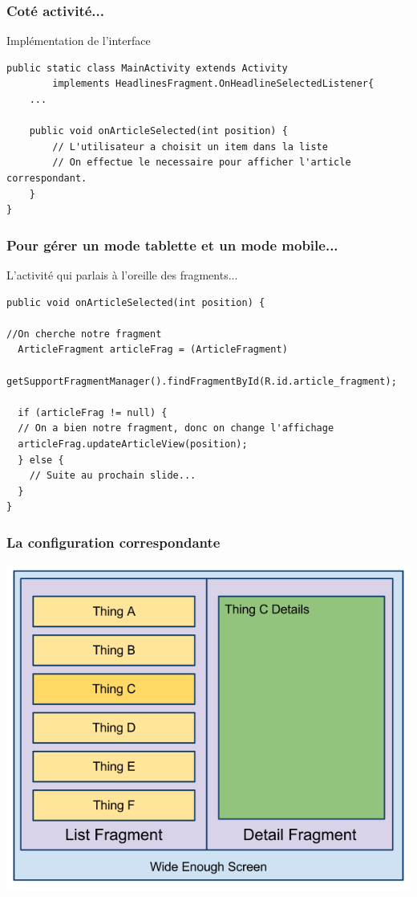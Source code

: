 \documentclass{beamer}
\begin{document}
\begin{frame}[fragile]
\frametitle{Coté activité...}
\begin{block}{Implémentation de l'interface}
\begin{lstlisting}
public static class MainActivity extends Activity
        implements HeadlinesFragment.OnHeadlineSelectedListener{
    ...
    
    public void onArticleSelected(int position) {
        // L'utilisateur a choisit un item dans la liste
        // On effectue le necessaire pour afficher l'article correspondant.
    }
}
\end{lstlisting}

\end{block}
\end{frame}

\begin{frame}[fragile]
\frametitle{Pour gérer un mode tablette et un mode mobile...}
\begin{block}{L'activité qui parlais à l'oreille des fragments...}
\begin{lstlisting}
public void onArticleSelected(int position) {

//On cherche notre fragment
  ArticleFragment articleFrag = (ArticleFragment)
    getSupportFragmentManager().findFragmentById(R.id.article_fragment);

  if (articleFrag != null) {
  // On a bien notre fragment, donc on change l'affichage
  articleFrag.updateArticleView(position);
  } else {
    // Suite au prochain slide...
  }
}
\end{lstlisting}
\end{block}
\end{frame}

\begin{frame}
\frametitle{La configuration correspondante}
\begin{center}
\includegraphics[scale=0.3]{fragments_duo.png}
\end{center}
\end{frame}
\end{document}
